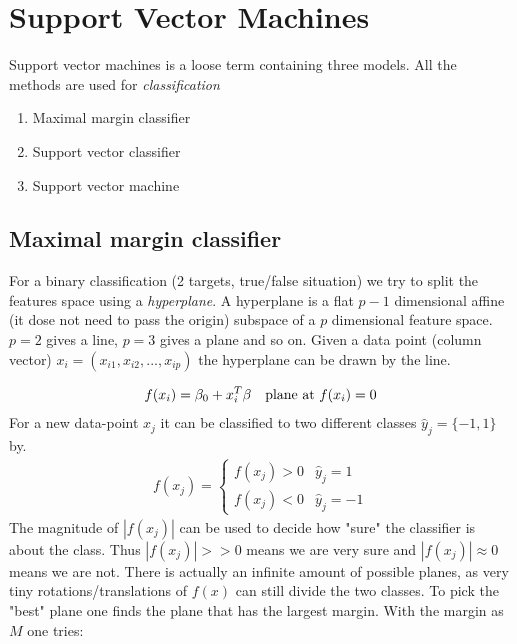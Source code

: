 \documentclass{article}
\begin{document}
\section{Support Vector Machines}
Support vector machines is a loose term containing three models. All the methods are used for \textit{classification} 

\begin{enumerate}
    \item Maximal margin classifier
    \item Support vector classifier 
    \item Support vector machine
\end{enumerate}

\subsection{Maximal margin classifier}
For a binary classification (2 targets, true/false situation) we try to split the features space using a \textit{hyperplane}. A hyperplane is a flat $p-1$ dimensional affine (it dose not need to pass the origin) subspace of a $p$ dimensional feature space. $p=2$ gives a line, $p=3$ gives a plane and so on. Given a data point (column vector) $x_i = (x_{i1}, x_{i2}, ... , x_{ip})$ the hyperplane can be drawn by the line.

\begin{align*}
     f(x_i) = \beta_0 + x_i^T \beta \hspace{10px}\text{plane at } f(x_i) = 0
\end{align*}
For a new data-point $x_j$ it can be classified to two different classes $\hat{y}_j = \{-1, 1\}$ by. 
\begin{align*}
    f(x_j) = \begin{cases}
    f(x_j) > 0 & \hat{y}_j = 1 \\
    f(x_j) < 0 & \hat{y}_j = -1
    \end{cases}
\end{align*}
The magnitude of $|f(x_j)|$ can be used to decide how "sure" the classifier is about the class. Thus $|f(x_j)| >> 0$ means we are very sure and $|f(x_j)| \approx 0$ means we are not. There is actually an infinite amount of possible planes, as very tiny rotations/translations of $f(x)$ can still divide the two classes. To pick the "best" plane one finds the plane that has the largest margin. With the margin as $M$ one tries:
\end{document}
